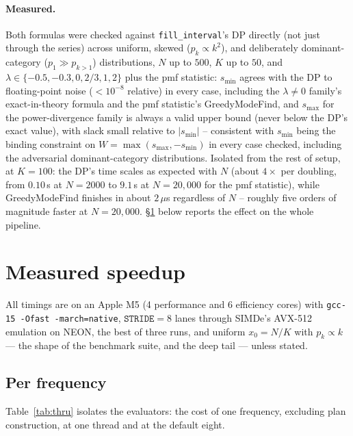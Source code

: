 \documentclass[11pt]{article}
\begin{document}
\paragraph{Measured.} Both formulas were checked against \texttt{fill\_interval}'s DP directly (not
just through the series) across uniform, skewed ($p_k\propto k^2$), and deliberately dominant-category
($p_1\gg p_{k>1}$) distributions, $N$ up to $500$, $K$ up to $50$, and $\lambda\in\{-0.5,-0.3,0,2/3,1,2\}$
plus the pmf statistic: $s_{\min}$ agrees with the DP to floating-point noise ($<10^{-8}$ relative) in
every case, including the $\lambda\ne0$ family's exact-in-theory formula and the pmf statistic's
GreedyModeFind, and $s_{\max}$ for the power-divergence family is always a valid upper bound (never
below the DP's exact value), with slack small relative to $|s_{\min}|$ -- consistent with $s_{\min}$
being the binding constraint on $W=\max(s_{\max},-s_{\min})$ in every case checked, including the
adversarial dominant-category distributions. Isolated from the rest of setup, at $K=100$: the DP's
time scales as expected with $N$ (about $4\times$ per doubling, from $0.10$\,s at $N=2000$ to $9.1$\,s
at $N=20{,}000$ for the pmf statistic), while GreedyModeFind finishes in about $2\,\mu$s regardless of
$N$ -- roughly five orders of magnitude faster at $N=20{,}000$. \S\ref{sec:speed} below reports the
effect on the whole pipeline.

\section{Measured speedup}
\label{sec:speed}

All timings are on an Apple M5 (4 performance and 6 efficiency cores) with \texttt{gcc-15 -Ofast
-march=native}, $\mathtt{STRIDE}=8$ lanes through SIMDe's AVX-512 emulation on NEON, the best of three
runs, and uniform $x_0=N/K$ with $p_k\propto k$ --- the shape of the benchmark suite, and the deep
tail --- unless stated.

\subsection{Per frequency}

Table~\ref{tab:thru} isolates the evaluators: the cost of one frequency, excluding plan construction,
at one thread and at the default eight.
\end{document}
